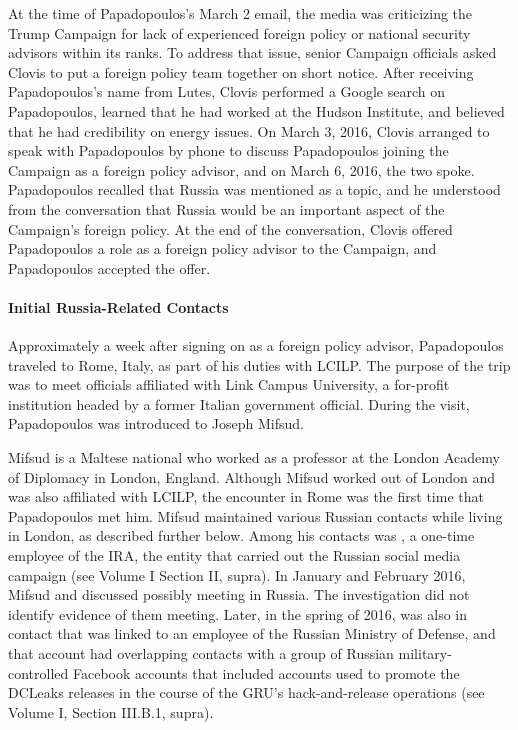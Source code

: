 At the time of Papadopoulos's March 2 email, the media was criticizing the Trump Campaign for lack of experienced foreign policy or national security advisors within its ranks.%
To address that issue, senior Campaign officials asked Clovis to put a foreign policy team together on short notice.%
After receiving Papadopoulos's name from Lutes, Clovis performed a Google search on Papadopoulos, learned that he had worked at the Hudson Institute, and believed that he had credibility on energy issues.%
On March 3, 2016, Clovis arranged to speak with Papadopoulos by phone to discuss Papadopoulos joining the Campaign as a foreign policy advisor, and on March 6, 2016, the two spoke.%
Papadopoulos recalled that Russia was mentioned as a topic, and he understood from the conversation that Russia would be an important aspect of the Campaign's foreign policy.%
At the end of the conversation, Clovis offered Papadopoulos a role as a foreign policy advisor to the Campaign, and Papadopoulos accepted the offer.%

\paragraph{Initial Russia-Related Contacts}

Approximately a week after signing on as a foreign policy advisor, Papadopoulos traveled to Rome, Italy, as part of his duties with LCILP.%
The purpose of the trip was to meet officials affiliated with Link Campus University, a for-profit institution headed by a former Italian government official.%
During the visit, Papadopoulos was introduced to Joseph Mifsud.

Mifsud is a Maltese national who worked as a professor at the London Academy of Diplomacy in London, England.%
Although Mifsud worked out of London and was also affiliated with LCILP, the encounter in Rome was the first time that Papadopoulos met him.%
Mifsud maintained various Russian contacts while living in London, as described further below.
Among his contacts was ,%
a one-time employee of the IRA, the entity that carried out the Russian social media campaign (see Volume I Section II, supra).
In January and February 2016, Mifsud and  discussed  possibly meeting in Russia.
The investigation did not identify evidence of them meeting.
Later, in the spring of 2016,  was also in contact  that was linked to an employee of the Russian Ministry of Defense, and that account had overlapping contacts with a group of Russian military-controlled Facebook accounts that included accounts used to promote the DCLeaks releases in the course of the GRU's hack-and-release operations (see Volume I, Section III.B.1, supra).

